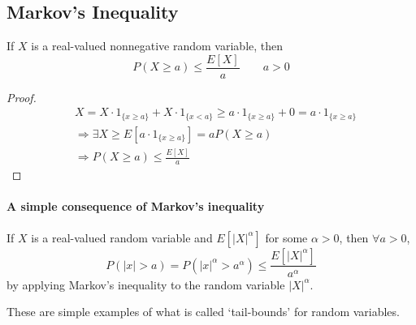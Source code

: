 \subsection{Markov's Inequality}
\begin{theorem}
    If $X$ is a real-valued nonnegative random variable, then
    \[ P(X \geq a) \leq \frac{E[X]}{a} \qquad a > 0                          \]
\end{theorem}
\begin{proof}
\begin{align*}
   &X = X \cdot 1_{\lbrace x \geq a \rbrace} + X \cdot 1_{\lbrace x < a\rbrace}
      \geq a \cdot 1_{\lbrace x \geq a \rbrace} + 0
      = a \cdot 1_{\lbrace x \geq a \rbrace}                                 \\
   &\Rightarrow \exists X \geq E[a \cdot 1_{\lbrace x \geq a \rbrace}]
                          = a P(X \geq a)                                    \\
   &\Rightarrow P(X \geq a) \leq \frac{E[X]}{a}
\end{align*}
\end{proof}

\paragraph{A simple consequence of Markov's inequality}
\begin{lemma}
If $X$ is a real-valued random variable and $E[\vert X \vert^\alpha]$ for some
$\alpha > 0$, then $\forall a > 0$,
\[
	P(\vert x \vert > a) = P(\vert x \vert^\alpha > a^\alpha)
	                     \leq \frac{E[\vert X \vert^\alpha]}{a^\alpha}
\]
by applying Markov's inequality to the random variable $\vert X
\vert^\alpha$.
\end{lemma}
\note These are simple examples of what is called `tail-bounds' for random
variables.
